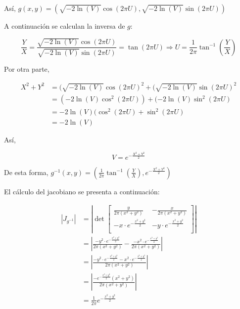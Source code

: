 \documentclass[]{article}
\begin{document}
Así,
\(g(x,y)=(\sqrt{-2\ln(V)}\cos(2\pi U),\sqrt{-2\ln(V)}\sin(2\pi U))\)

A continuación se calculan la inversa de \(g\):

\begin{equation}
\frac{Y}{X}=\frac{\sqrt{-2\ln(V)}\cos(2\pi U)}{\sqrt{-2\ln(V)}\sin(2\pi U)}
=\tan(2 \pi U) \Rightarrow U=\frac{1}{2 \pi}\tan^{-1}\left( \frac{Y}{X}  \right)
\end{equation}

Por otra parte,

\begin{equation}
\begin{split}
X^2+Y^2&=(\sqrt{-2\ln(V)}\cos(2\pi U)^2+(\sqrt{-2\ln(V)}\sin(2\pi U)^2\\
&= (-2\ln(V)\cos^2(2\pi U))+(-2\ln(V)\sin^2(2\pi U)\\
&= -2\ln(V)(\cos^2(2\pi U)+\sin^2(2\pi U)\\
&= -2\ln(V)
\end{split}
\end{equation}

Así,

\begin{equation}
V = e^{-\frac{X^2+Y^2}{2}}
\end{equation}

De esta forma,
\(g^{-1}(x,y)= \left(\frac{1}{2 \pi}\tan^{-1}\left( \frac{Y}{X} \right),e^{-\frac{X^2+Y^2}{2}}\right)\)

El cálculo del jacobiano se presenta a continuación:

\begin{equation}
\begin{split}
\left| J_{g^{-1}}  \right|
&=\left| \det 
\begin{bmatrix} 
\frac{y}{2\pi(x^2+y^2)} &  -\frac{x}{2\pi(x^2+y^2)} \\
-x\cdot e^{-\frac{x^2+y^2}{2}} &  -y\cdot e^{-\frac{x^2+y^2}{2}} \\
\end{bmatrix}  \right|\\
&=
\left|
\frac{-y^2\cdot e^{-\frac{x^2+y^2}{2}}}{2\pi(x^2+y^2)}-
\frac{-x^2\cdot e^{-\frac{x^2+y^2}{2}}}{2\pi(x^2+y^2)}
\right|\\
&=
\left|
\frac{-y^2\cdot e^{-\frac{x^2+y^2}{2}}-x^2\cdot e^{-\frac{x^2+y^2}{2}}}{2\pi(x^2+y^2)}
\right|\\
&=
\left|
\frac{-e^{-\frac{x^2+y^2}{2}}(x^2+y^2)}{2\pi(x^2+y^2)}
\right|\\
&=
\frac{1}{2\pi}e^{-\frac{x^2+y^2}{2}}
\end{split}
\end{equation}
\end{document}
